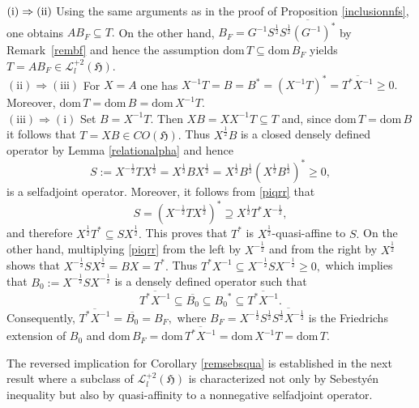 \documentclass{amsart}
\makeatletter
\newcommand{\h}{\mathfrak{H}}
\newcommand{\D}{\mathrm{dom}\,}
\newcommand{\DT}{\mathrm{dom}\,T }
\newcommand{\DB}{\mathrm{dom}\,B }
\newcommand{\adj}{^*}
\newcommand{\inv}{^{-1}}
\newcommand{\tstar}{T^{*}}
\newcommand{\half}{^{\frac{1}{2}}}
\newcommand{\mhalf}{^{-\frac{1}{2}}}
\newcommand{\inclu}{\subseteq}
\newcommand{\ldeux}{\mathcal{L}_l^{+2}(\h)}
\numberwithin{equation}{section}
\renewenvironment{proof}[1][\proofname]{%
   \par\pushQED{\qed}\normalfont%
   \topsep6\p@\@plus6\p@\relax
   \trivlist\item[\hskip\labelsep\bfseries#1\@addpunct{.}]%
   \ignorespaces
}{%
   \popQED\endtrivlist\@endpefalse
}
\makeatother
\begin{document}
 \begin{proof}$\rm (i) \Rightarrow (ii)$
 Using the same arguments as in the proof of Proposition \ref{inclusionnfs}, one obtains $A B_F \inclu T.$
 On the other hand, $B_F = G\inv S\half \overline{S\half  (G\inv)\adj}$ by  Remark~\ref{rembf}  and hence the assumption   $\DT \inclu  \D B_F  $  yields $T = A B_F \in \ldeux.$ \\
      \hspace*{0.4cm}  $\mathrm{(ii)} \Rightarrow \mathrm{(iii)} $ For $X= A$  one has $ X\inv T = B = B\adj = (X\inv T)\adj = \overline{ \tstar X\inv} \geq 0.$ Moreover, $\DT = \DB = \D X\inv T.$\\
      \hspace*{0.4cm}  $\mathrm{(iii)} \Rightarrow \mathrm{(i)}$ Set $B= X\inv T.$ Then $XB =X X\inv T \inclu T$ and, since $\DT = \D B$ it follows that $T =XB \in CO(\h).$ Thus $X \half B$ is a  closed densely defined operator  by Lemma \ref{relationalpha} and hence
      \begin{equation}\label{piqrr}
         S:= X\mhalf T X\half = X\half B X\half = X\half B\half (X\half B\half)\adj  \geq 0,
      \end{equation}
      is a selfadjoint operator. Moreover, it follows from \eqref{piqrr} that
      $$
      S =  (X\mhalf T X\half)\adj \supseteq X\half \tstar X\mhalf,
      $$
      and therefore $X\half \tstar  \inclu S X\half.$ This proves that $\tstar$ is $X\half$-quasi-affine to $S.$ On the other hand, multiplying \eqref{piqrr} from the left by $X\mhalf$ and from the right by $X\half$ shows that
      $
      X\mhalf S X\half = BX = \tstar.
      $
       Thus $\tstar X\inv  \inclu X\mhalf S X\mhalf \geq 0,$ which implies  that $B_0:= X\mhalf S X\mhalf$ is a densely defined operator such that
       $$
       \overline{\tstar X\inv}  \inclu \overline{B_0} \inclu {B_0}\adj \inclu  \overline{\tstar X\inv}.
       $$
       Consequently, $ \overline{\tstar X\inv}  = \overline{B_0} = B_F,$ where $B_F = X\mhalf S\half  \overline{S\half  X\mhalf}  $ is the Friedrichs extension of $B_0$ and $\D B_F = \D \overline{\tstar X\inv} = \D X\inv T = \DT.$
 \end{proof}

 The reversed implication for Corollary \ref{remsebsqua} is established in the next result where a subclass of $\ldeux$ is characterized not only by Sebestyén  inequality but also by quasi-affinity to a nonnegative selfadjoint operator.
\end{document}
